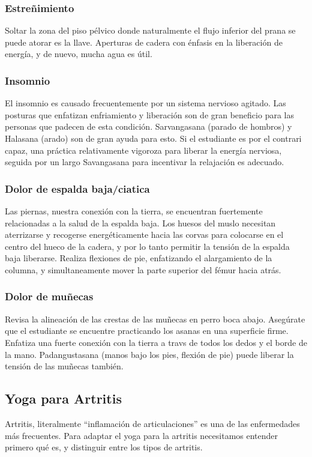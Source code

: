 \subsubsection{Estreñimiento}
Soltar la zona del piso p\'elvico donde naturalmente el flujo inferior del prana se puede atorar es la llave. Aperturas de cadera con \'enfasis en la liberación de energía, y de nuevo, mucha agua es útil.
\subsubsection{Insomnio}
El insomnio es causado frecuentemente por un sistema nervioso agitado. Las posturas que enfatizan enfriamiento y liberación son de gran beneficio para las personas que padecen de esta condición. Sarvangasana (parado de hombros) y Halasana (arado) son de gran ayuda para esto. Si el estudiante es por el contrari capaz, una práctica relativamente vigoroza para liberar la energía nerviosa, seguida por un largo Savangasana para incentivar la relajación es adecuado.
\subsubsection{Dolor de espalda baja/ciatica}
Las piernas, nuestra conexión con la tierra, se encuentran fuertemente relacionadas a la salud de la espalda baja. Los huesos del muslo necesitan aterrizarse y recogerse energ\'eticamente hacia las corvas para colocarse en el centro del hueco de la cadera, y por lo tanto permitir la tensión de la espalda baja liberarse. Realiza flexiones de pie, enfatizando el alargamiento de la columna, y simultaneamente mover la parte superior del f\'emur hacia atrás.
\subsubsection{Dolor de muñecas}
Revisa la alineación de las crestas de las muñecas en perro boca abajo. Asegúrate que el estudiante se encuentre practicando los asanas en una superficie firme. Enfatiza una fuerte conexión con la tierra a travs de todos los dedos y el borde de la mano. Padangustasana (manos bajo los pies, flexión de pie) puede liberar la tensión de las muñecas tambi\'en.

\subsection{Yoga para Artritis}
Artritis, literalmente ``inflamación de articulaciones'' es una de las enfermedades más frecuentes. Para adaptar el yoga para la artritis necesitamos entender primero qu\'e es, y distinguir entre los tipos de artritis.

